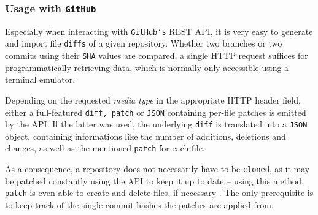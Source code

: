 \subsubsection{Usage with \texttt{GitHub}}
Especially when interacting with \texttt{GitHub's} REST API, it is very easy to generate and import file \texttt{diffs} of a given repository. Whether two branches or two commits using their \texttt{SHA} values are compared, a single HTTP request suffices for programmatically retrieving data, which is normally only accessible using a terminal emulator.

Depending on the requested \emph{media type} in the appropriate HTTP header field, either a full-featured \texttt{diff, patch} or \texttt{JSON} containing per-file patches is emitted by the API. If the latter was used, the underlying \texttt{diff} is translated into a \texttt{JSON} object, containing informations like the number of additions, deletions and changes, as well as the mentioned \texttt{patch} for each file.

As a consequence, a repository does not necessarily have to be \texttt{cloned}, as it may be patched constantly using the API to keep it up to date -- using this method, \texttt{patch} is even able to create and delete files, if necessary \cite[57]{mackenzie2003comparing}. The only prerequisite is to keep track of the single commit hashes the patches are applied from.
